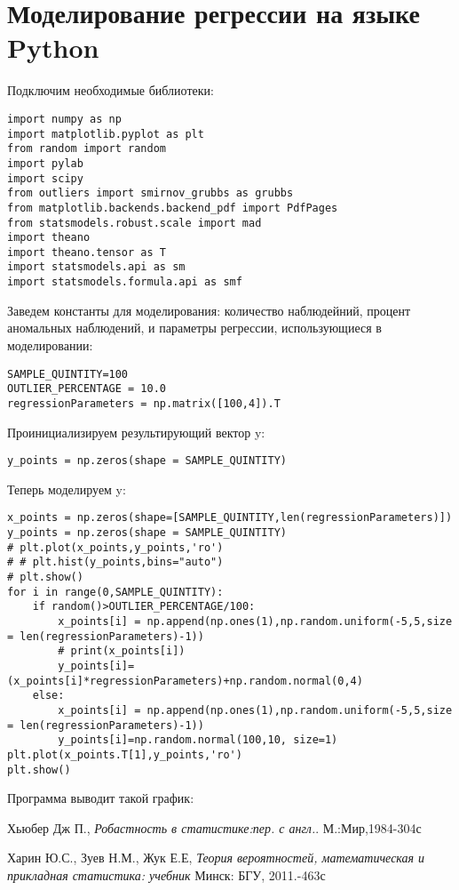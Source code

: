 \documentclass[12pt]{article}
\begin{document}
\section{Моделирование регрессии на языке Python}
Подключим необходимые библиотеки:\hfill\break
\begin{verbatim}
import numpy as np
import matplotlib.pyplot as plt
from random import random
import pylab
import scipy
from outliers import smirnov_grubbs as grubbs
from matplotlib.backends.backend_pdf import PdfPages
from statsmodels.robust.scale import mad
import theano
import theano.tensor as T
import statsmodels.api as sm
import statsmodels.formula.api as smf
\end{verbatim}
Заведем константы для моделирования: количество наблюдейний, процент аномальных наблюдений, и параметры регрессии, использующиеся в моделировании:
\begin{verbatim}
SAMPLE_QUINTITY=100
OUTLIER_PERCENTAGE = 10.0
regressionParameters = np.matrix([100,4]).T
\end{verbatim}
Проинициализируем результирующий вектор y:
\begin{verbatim}
y_points = np.zeros(shape = SAMPLE_QUINTITY)
\end{verbatim}
Теперь моделируем y:
\begin{verbatim}
x_points = np.zeros(shape=[SAMPLE_QUINTITY,len(regressionParameters)])
y_points = np.zeros(shape = SAMPLE_QUINTITY)
# plt.plot(x_points,y_points,'ro')
# # plt.hist(y_points,bins="auto")
# plt.show()
for i in range(0,SAMPLE_QUINTITY):
    if random()>OUTLIER_PERCENTAGE/100:
        x_points[i] = np.append(np.ones(1),np.random.uniform(-5,5,size = len(regressionParameters)-1))
        # print(x_points[i])
        y_points[i]=(x_points[i]*regressionParameters)+np.random.normal(0,4)
    else:
        x_points[i] = np.append(np.ones(1),np.random.uniform(-5,5,size = len(regressionParameters)-1))
        y_points[i]=np.random.normal(100,10, size=1)
plt.plot(x_points.T[1],y_points,'ro')
plt.show()
\end{verbatim}
Программа выводит такой график:
\newpage
\begin{thebibliography}{9}
    Хьюбер Дж П.,
    \textit{Робастность в статистике:пер. с англ.}.
    М.:Мир,1984-304с

    Харин Ю.С., Зуев Н.М., Жук Е.Е,
    \textit{Теория вероятностей, математическая и прикладная статистика: учебник}
    Минск: БГУ, 2011.-463с
\end{thebibliography}
\end{document}
